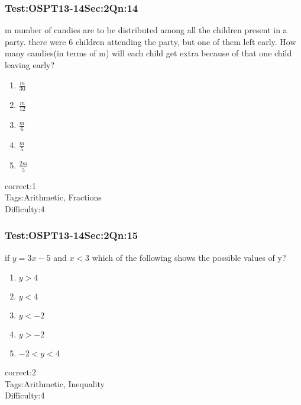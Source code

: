 \documentclass[]{beamer}
\begin{document}
    \begin{frame}
	    \frametitle{Test:OSPT13-14\hspace{2mm}Sec:2\hspace{2mm}Qn:14}
	    m number of candies are to be distributed among all the children present in a party. there were 6 children attending the party, but one of them left early. How many candies(in terms of m) will each child get extra because of that one child leaving early?
	   \begin{enumerate}
	        \item
	           $\frac{m}{30}$
	        \item
	           $\frac{m}{12}$ 
	        \item
	           $\frac{m}{6}$
	        \item
	            $\frac{m}{5}$
	        \item
	           $\frac{2m}{5}$
	    \end{enumerate}
	    correct:1\\   
	    Tags:Arithmetic, Fractions \\
	    Difficulty:4   \\
    \end{frame}    
    \begin{frame}
	    \frametitle{Test:OSPT13-14\hspace{2mm}Sec:2\hspace{2mm}Qn:15}
	    if $y=3x-5$ and $x<3$ which of the following shows the possible values of y?
	   \begin{enumerate}
	        \item
	           $y>4$
	        \item
	            $y<4$
	        \item
	           $y<-2$
	        \item
	            $y>-2$
	        \item
	           $-2<y<4$       
	    \end{enumerate}
	    correct:2\\   
	    Tags:Arithmetic, Inequality \\
	    Difficulty:4   \\
    \end{frame}    
\end{document}
